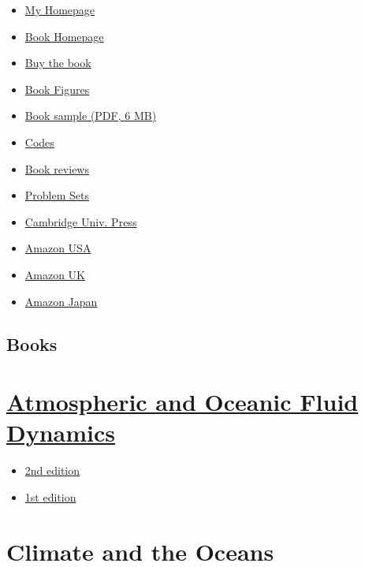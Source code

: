 \begin{itemize}
\tightlist
\item
  \href{../papers/index.html}{My Homepage}
\item
  \href{http://empslocal.ex.ac.uk/people/staff/gv219/aofd}{Book
  Homepage}
\item
  \href{http://empslocal.ex.ac.uk/people/staff/gv219/aofd/aofdbuy.html}{Buy
  the book}
\item
  \href{http://empslocal.ex.ac.uk/people/staff/gv219/aofdfigures}{Book
  Figures}
\item
  \href{aofd-sample.pdf}{Book sample (PDF, 6 MB)}
\item
  \href{http://empslocal.ex.ac.uk/people/staff/gv219/codes/index.html}{Codes}
\item
  \href{http://empslocal.ex.ac.uk/people/staff/gv219/aofdreviews/}{Book
  reviews}
\item
  \href{http://empslocal.ex.ac.uk/people/staff/gv219/Problems/}{Problem
  Sets}
\item
  \href{http://www.cambridge.org/Vallis2}{Cambridge Univ. Press}
\item
  \href{https://www.amazon.com/dp/110706550X/ref=pe_385721_37986871_TE_item}{Amazon
  USA}
\item
  \href{https://www.amazon.co.uk/dp/110706550X/ref=pe_385721_37986871_TE_item}{Amazon
  UK}
\item
  \href{https://www.amazon.co.jp/dp/110706550X/ref=pe_385721_37986871_TE_item}{Amazon
  Japan}
\end{itemize}

\subsection{Books}\label{books}

\section{\texorpdfstring{\href{../aofd/index.html}{Atmospheric and
Oceanic Fluid
Dynamics}}{Atmospheric and Oceanic Fluid Dynamics}}\label{atmospheric-and-oceanic-fluid-dynamics-1}

\begin{itemize}
\tightlist
\item
  \href{../aofd/index.html}{2nd edition}
\item
  \href{../vallisbook/index.php}{1st edition}
\end{itemize}

\section{Climate and the Oceans}\label{climate-and-the-oceans}

